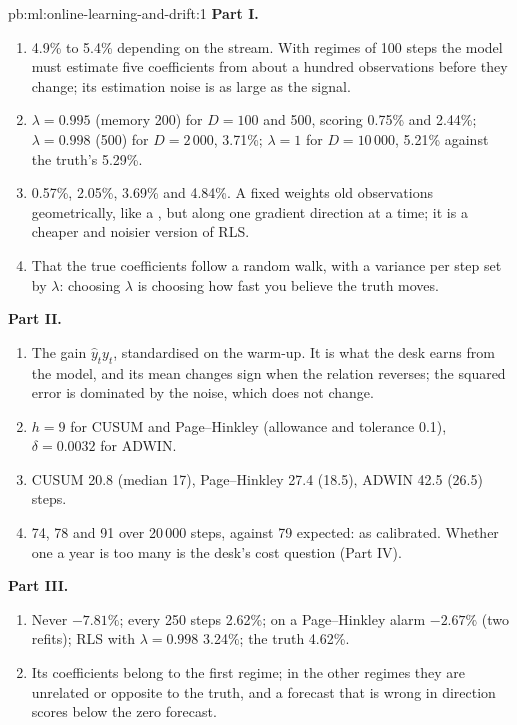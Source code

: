 \begin{solution}{pb:ml:online-learning-and-drift:1}
\textbf{Part I.}
\begin{enumerate}
\item 4.9\% to 5.4\% depending on the stream. With regimes of 100 steps the model must estimate five coefficients from
about a hundred observations before they change; its estimation noise is as large as the signal.
\item $\lambda = 0.995$ (memory 200) for $D = 100$ and 500, scoring 0.75\% and 2.44\%; $\lambda = 0.998$ (500) for
$D = 2\,000$, 3.71\%; $\lambda = 1$ for $D = 10\,000$, 5.21\% against the truth's 5.29\%.
\item 0.57\%, 2.05\%, 3.69\% and 4.84\%. A fixed  weights old observations geometrically, like a , but along one gradient direction at a time; it is a cheaper and noisier version of RLS.
\item That the true coefficients follow a random walk, with a variance per step set by $\lambda$: choosing $\lambda$ is
choosing how fast you believe the truth moves.
\end{enumerate}
\textbf{Part II.}
\begin{enumerate}[resume]
\item The gain $\hat y_ty_t$, standardised on the warm-up. It is what the desk earns from the model, and its mean changes
sign when the relation reverses; the squared error is dominated by the noise, which does not change.
\item $h = 9$ for CUSUM and Page--Hinkley (allowance and tolerance 0.1), $\delta = 0.0032$ for ADWIN.
\item CUSUM 20.8 (median 17), Page--Hinkley 27.4 (18.5), ADWIN 42.5 (26.5) steps.
\item 74, 78 and 91 over 20\,000 steps, against 79 expected: as calibrated. Whether one a year is too many is the desk's
cost question (Part IV).
\end{enumerate}
\textbf{Part III.}
\begin{enumerate}[resume]
\item Never $-7.81\%$; every 250 steps 2.62\%; on a Page--Hinkley alarm $-2.67\%$ (two refits); RLS with $\lambda = 0.998$
3.24\%; the truth 4.62\%.
\item Its coefficients belong to the first regime; in the other regimes they are unrelated or opposite to the truth, and a
forecast that is wrong in direction scores below the zero forecast.

\end{enumerate}
\end{solution}
